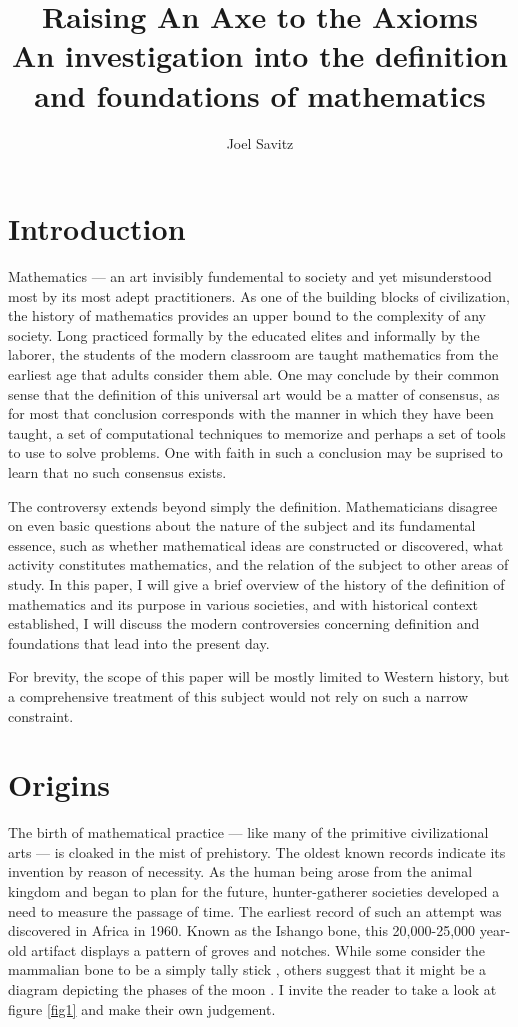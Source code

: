 \documentclass[12pt]{article}
\title{Raising An Axe to the Axioms \\ \small An investigation into the definition and foundations of mathematics}
\author{Joel Savitz}
\begin{document}
\maketitle


\section{Introduction}

Mathematics ---
an art invisibly fundemental to society
and yet misunderstood most by its most adept practitioners.
As one of the building blocks of civilization,
the history of mathematics provides an upper bound
to the complexity of any society.
Long practiced formally by the educated elites
and informally by the laborer,
the students of the modern classroom
are taught mathematics from the earliest age
that adults consider them able.
One may conclude by their common sense
that the definition of this universal art
would be a matter of consensus,
as for most that conclusion corresponds
with the manner in which they have been taught,
a set of computational techniques to memorize and
perhaps a set of tools to use to solve problems.
One with faith in such a conclusion
may be suprised to learn that
no such consensus exists.

The controversy extends
beyond simply the definition.
Mathematicians disagree on even
basic questions
about the nature of the subject
and its fundamental essence,
such as whether mathematical ideas
are constructed or discovered,
what activity constitutes mathematics,
and the relation of the subject
to other areas of study.
In this paper,
I will give a brief overview
of the history of the definition of mathematics
and its purpose in various societies,
and with historical context established,
I will discuss the modern controversies
concerning definition and foundations
that lead into the present day.

For brevity, the scope of this paper
will be mostly limited
to Western history,
but a comprehensive treatment of this subject
would not rely on such a narrow constraint.

\section{Origins}

The birth of mathematical practice
--- like many of the primitive civilizational arts ---
is cloaked in the mist of prehistory.
The oldest known records indicate its
invention by reason of necessity.
As the human being arose from the animal kingdom
and began to plan for the future,
hunter-gatherer societies developed
a need to measure the passage of time.
The earliest record of such an attempt
was discovered in Africa in 1960.
Known as the Ishango bone,
this 20,000-25,000 year-old artifact
displays a pattern of groves and notches.
While some consider the mammalian bone
to be a simply tally stick \cite{ishango},
others suggest that it might be a diagram
depicting the phases of the moon \cite{ishango2}.
I invite the reader to take a look at figure \ref{fig1}
and make their own judgement.
\end{document}
